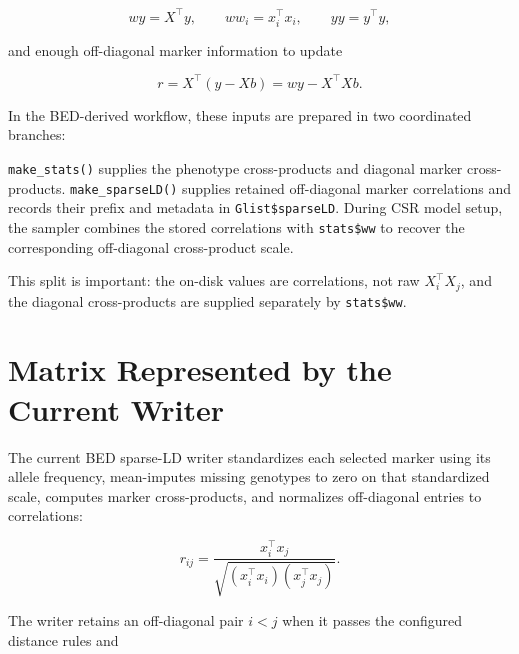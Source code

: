 \documentclass[
  11pt,
  letterpaper,
  DIV=11,
  numbers=noendperiod]{scrartcl}
\newenvironment{Shaded}{\begin{snugshade}}{\end{snugshade}}
\newcommand{\NormalTok}[1]{\textcolor[rgb]{0.12,0.11,0.11}{#1}}
\begin{document}
\[
wy=X^\top y,
\qquad
ww_i=x_i^\top x_i,
\qquad
yy=y^\top y,
\]

and enough off-diagonal marker information to update

\[
r=X^\top(y-Xb)=wy-X^\top Xb.
\]

In the BED-derived workflow, these inputs are prepared in two
coordinated branches:

\begin{Shaded}
\end{Shaded}

\texttt{make\_stats()} supplies the phenotype cross-products and
diagonal marker cross-products. \texttt{make\_sparseLD()} supplies
retained off-diagonal marker correlations and records their prefix and
metadata in \texttt{Glist\$sparseLD}. During CSR model setup, the
sampler combines the stored correlations with \texttt{stats\$ww} to
recover the corresponding off-diagonal cross-product scale.

This split is important: the on-disk values are correlations, not raw
\(X_i^\top X_j\), and the diagonal cross-products are supplied
separately by \texttt{stats\$ww}.

\section{Matrix Represented by the Current
Writer}\label{matrix-represented-by-the-current-writer}

The current BED sparse-LD writer standardizes each selected marker using
its allele frequency, mean-imputes missing genotypes to zero on that
standardized scale, computes marker cross-products, and normalizes
off-diagonal entries to correlations:

\[
r_{ij}
=
\frac{x_i^\top x_j}
{\sqrt{(x_i^\top x_i)(x_j^\top x_j)}}.
\]

The writer retains an off-diagonal pair \(i<j\) when it passes the
configured distance rules and
\end{document}
